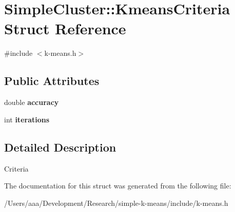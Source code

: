 \hypertarget{structSimpleCluster_1_1KmeansCriteria}{\section{Simple\+Cluster\+:\+:Kmeans\+Criteria Struct Reference}
\label{structSimpleCluster_1_1KmeansCriteria}
}


{\ttfamily \#include $<$k-\/means.\+h$>$}

\subsection*{Public Attributes}
\begin{DoxyCompactItemize}
\item 
\hypertarget{structSimpleCluster_1_1KmeansCriteria_a417746caabd9c8aa94eae201ebe706ff}{double {\bfseries accuracy}}\label{structSimpleCluster_1_1KmeansCriteria_a417746caabd9c8aa94eae201ebe706ff}

\item 
\hypertarget{structSimpleCluster_1_1KmeansCriteria_a315f994501adf69d674ff6ab57291f91}{int {\bfseries iterations}}\label{structSimpleCluster_1_1KmeansCriteria_a315f994501adf69d674ff6ab57291f91}

\end{DoxyCompactItemize}


\subsection{Detailed Description}
Criteria 

The documentation for this struct was generated from the following file\+:\begin{DoxyCompactItemize}
\item 
/\+Users/aaa/\+Development/\+Research/simple-\/k-\/means/include/k-\/means.\+h\end{DoxyCompactItemize}
